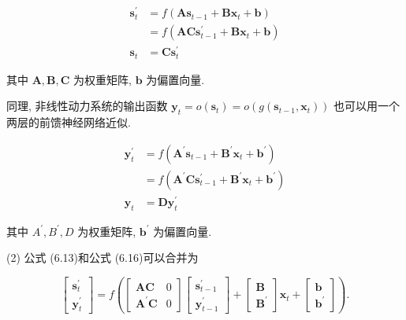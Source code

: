 \documentclass[10pt]{article}
\begin{document}
\begin{align*}
\boldsymbol{s}_{t}^{\prime} & =f\left(\boldsymbol{A} \boldsymbol{s}_{t-1}+\boldsymbol{B} \boldsymbol{x}_{t}+\boldsymbol{b}\right)  \tag{6.12}\\
& =f\left(\boldsymbol{A C} \boldsymbol{s}_{t-1}^{\prime}+\boldsymbol{B} \boldsymbol{x}_{t}+\boldsymbol{b}\right)  \tag{6.13}\\
\boldsymbol{s}_{t} & =\boldsymbol{C} \boldsymbol{s}_{t}^{\prime} \tag{6.14}
\end{align*}


其中 $\boldsymbol{A}, \boldsymbol{B}, \boldsymbol{C}$ 为权重矩阵, $\boldsymbol{b}$ 为偏置向量.

同理, 非线性动力系统的输出函数 $\boldsymbol{y}_{t}=o\left(\boldsymbol{s}_{t}\right)=o\left(g\left(\boldsymbol{s}_{t-1}, \boldsymbol{x}_{t}\right)\right)$ 也可以用一个两层的前馈神经网络近似.


\begin{align*}
\boldsymbol{y}_{t}^{\prime} & =f\left(\boldsymbol{A}^{\prime} \boldsymbol{s}_{t-1}+\boldsymbol{B}^{\prime} \boldsymbol{x}_{t}+\boldsymbol{b}^{\prime}\right)  \tag{6.15}\\
& =f\left(\boldsymbol{A}^{\prime} \boldsymbol{C} \boldsymbol{s}_{t-1}^{\prime}+\boldsymbol{B}^{\prime} \boldsymbol{x}_{t}+\boldsymbol{b}^{\prime}\right)  \tag{6.16}\\
\boldsymbol{y}_{t} & =\boldsymbol{D} \boldsymbol{y}_{t}^{\prime} \tag{6.17}
\end{align*}


其中 $A^{\prime}, B^{\prime}, D$ 为权重矩阵, $\boldsymbol{b}^{\prime}$ 为偏置向量.

(2) 公式 (6.13)和公式 (6.16)可以合并为

\[
\left[\begin{array}{l}
\boldsymbol{s}_{t}^{\prime}  \tag{6.18}\\
\boldsymbol{y}_{t}^{\prime}
\end{array}\right]=f\left(\left[\begin{array}{cc}
\boldsymbol{A C} & 0 \\
\boldsymbol{A}^{\prime} \boldsymbol{C} & 0
\end{array}\right]\left[\begin{array}{l}
\boldsymbol{s}_{t-1}^{\prime} \\
\boldsymbol{y}_{t-1}^{\prime}
\end{array}\right]+\left[\begin{array}{l}
\boldsymbol{B} \\
\boldsymbol{B}^{\prime}
\end{array}\right] \boldsymbol{x}_{t}+\left[\begin{array}{l}
\boldsymbol{b} \\
\boldsymbol{b}^{\prime}
\end{array}\right]\right) .
\]
\end{document}
